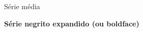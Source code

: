 \documentclass[a4paper,12pt]{article}
\begin{document}
	\mdseries Série média
	
	\bfseries Série negrito expandido (ou boldface)
	
	
\end{document}
